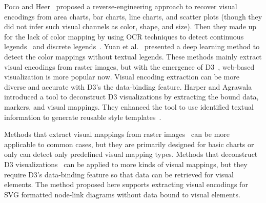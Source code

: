 Poco and Heer~\cite{DBLP:journals/cgf/PocoH17} proposed a reverse-engineering approach to recover visual encodings from area charts, bar charts, line charts, and scatter plots (though they did not infer such visual channels as color, shape, and size).
Then they made up for the lack of color mapping by using OCR techniques to detect continuous legends~\cite{DBLP:journals/tvcg/PocoMH18} and discrete legends~\cite{DBLP:conf/sibgrapi/MayhuaNHP18}.
Yuan et al.~\cite{DBLP:journals/corr/abs-2103-00741} presented a deep learning method to detect the color mappings without textual legends.
These methods mainly extract visual encodings from raster images, but with the emergence of D3~\cite{DBLP:journals/tvcg/BostockOH11}, web-based visualization is more popular now.
Visual encoding extraction can be more diverse and accurate with D3's the data-binding feature.
Harper and Agrawala~\cite{DBLP:conf/uist/HarperA14} introduced a tool to deconstruct D3 visualizations by extracting the bound data, markers, and visual mappings. 
They enhanced the tool to use identified textual information to generate reusable style templates~\cite{DBLP:journals/tvcg/HarperA18, DBLP:journals/tvcg/HoqueA20}. %

Methods that extract visual mappings from raster images~\cite{DBLP:journals/cgf/PocoH17, DBLP:journals/tvcg/PocoMH18, DBLP:conf/sibgrapi/MayhuaNHP18, DBLP:journals/corr/abs-2103-00741} can be more applicable to common cases, but they are primarily designed for basic charts or only can detect only predefined visual mapping types.
Methods that deconstruct D3 visualizations~\cite{DBLP:conf/uist/HarperA14, DBLP:journals/tvcg/HarperA18, DBLP:journals/tvcg/HoqueA20} can be applied to more kinds of visual mappings, but they require D3's data-binding feature so that data can be retrieved for visual elements. The method proposed here supports extracting visual encodings for SVG formatted node-link diagrams without data bound to visual elements.

